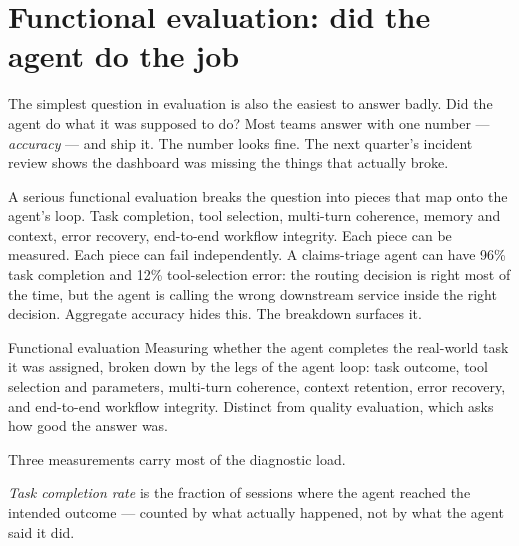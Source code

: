 \label{ch:40-evaluation-15-production}

\starttwocol

\section{Functional evaluation: did the agent do the job}

The simplest question in evaluation is also the easiest to answer badly. Did the agent do what it was supposed to do? Most teams answer with one number --- \textit{accuracy} --- and ship it. The number looks fine. The next quarter's incident review shows the dashboard was missing the things that actually broke.

A serious functional evaluation breaks the question into pieces that map onto the agent's loop. Task completion, tool selection, multi-turn coherence, memory and context, error recovery, end-to-end workflow integrity. Each piece can be measured. Each piece can fail independently. A claims-triage agent can have 96\% task completion and 12\% tool-selection error: the routing decision is right most of the time, but the agent is calling the wrong downstream service inside the right decision. Aggregate accuracy hides this. The breakdown surfaces it.

\begin{TNdefinition}{Functional evaluation}
Measuring whether the agent completes the real-world task it was assigned, broken down by the legs of the agent loop: task outcome, tool selection and parameters, multi-turn coherence, context retention, error recovery, and end-to-end workflow integrity. Distinct from quality evaluation, which asks how good the answer was.
\end{TNdefinition}

Three measurements carry most of the diagnostic load.

\textit{Task completion rate} is the fraction of sessions where the agent reached the intended outcome --- counted by what actually happened, not by what the agent said it did.

